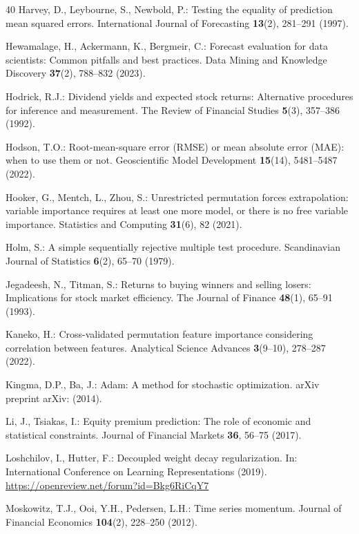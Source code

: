 \documentclass[runningheads,orivec]{llncs}
\begin{document}
\begin{thebibliography}{40}
Harvey, D., Leybourne, S., Newbold, P.: Testing the equality of prediction mean squared errors. International Journal of Forecasting \textbf{13}(2), 281--291 (1997).

Hewamalage, H., Ackermann, K., Bergmeir, C.: Forecast evaluation for data scientists: Common pitfalls and best practices. Data Mining and Knowledge Discovery \textbf{37}(2), 788--832 (2023).

Hodrick, R.J.: Dividend yields and expected stock returns: Alternative procedures for inference and measurement. The Review of Financial Studies \textbf{5}(3), 357--386 (1992).

Hodson, T.O.: Root-mean-square error (RMSE) or mean absolute error (MAE): when to use them or not. Geoscientific Model Development \textbf{15}(14), 5481--5487 (2022).

Hooker, G., Mentch, L., Zhou, S.: Unrestricted permutation forces extrapolation: variable importance requires at least one more model, or there is no free variable importance. Statistics and Computing \textbf{31}(6), 82 (2021).

Holm, S.: A simple sequentially rejective multiple test procedure. Scandinavian Journal of Statistics \textbf{6}(2), 65--70 (1979).

Jegadeesh, N., Titman, S.: Returns to buying winners and selling losers: Implications for stock market efficiency. The Journal of Finance \textbf{48}(1), 65--91 (1993).

Kaneko, H.: Cross-validated permutation feature importance considering correlation between features. Analytical Science Advances \textbf{3}(9--10), 278--287 (2022).

Kingma, D.P., Ba, J.: Adam: A method for stochastic optimization. arXiv preprint arXiv: (2014).

Li, J., Tsiakas, I.: Equity premium prediction: The role of economic and statistical constraints. Journal of Financial Markets \textbf{36}, 56--75 (2017).

Loshchilov, I., Hutter, F.: Decoupled weight decay regularization. In: International Conference on Learning Representations (2019). \url{https://openreview.net/forum?id=Bkg6RiCqY7}

Moskowitz, T.J., Ooi, Y.H., Pedersen, L.H.: Time series momentum. Journal of Financial Economics \textbf{104}(2), 228--250 (2012).


\end{thebibliography}
\end{document}
